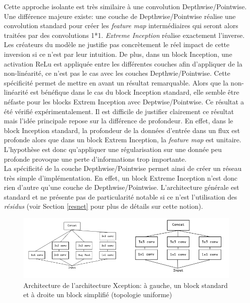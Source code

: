 \noindent Cette approche isolante est très similaire à une convolution Depthwise/Pointwise. Une différence majeure existe: une couche de Depthwise/Pointwise réalise une convolution standard pour créer les \textit{feature map} intermédiaires qui seront alors traitées par des convolutions 1*1. \textit{Extreme Inception} réalise exactement l'inverse. Les créateurs du modèle ne justifie pas concrètement le réel impact de cette inversion si ce n'est par leur intuition. De plus, dans un block Inception, une activation ReLu est appliquée entre les différentes couches afin d'appliquer de la non-linéarité, ce n'est pas le cas avec les couches Depthwie/Pointwise. Cette spécificité permet de mettre en avant un résultat remarquable. Alors que la non-linéarité est bénéfique dans le cas du block Inception standard\cite{inceptrelu}, elle semble être néfaste pour les blocks Extrem Inception avec Deptwise/Pointwise\cite{xception}. Ce résultat a été vérifié expérimentalement. Il est difficile de justifier clairement ce résultat mais l'idée principale repose sur la différence de profondeur. En effet, dans le block Inception standard, la profondeur de la données d'entrée dans un flux est profonde alors que dans un block Extrem Inception, la \textit{feature map} est unitaire. L'hypothèse est donc qu'appliquer une régularisation sur une donnée peu profonde provoque une perte d'informations trop importante.\\

\noindent La spécificité de la couche Depthwise/Pointwise permet ainsi de créer un réseau très simple d'implémentation. En effet, un block Extreme Inception n'est donc rien d'autre qu'une couche de Depthwise/Pointwise. L'architecture générale est standard et ne présente pas de particularité notable si ce n'est l'utilisation des \textit{résidus} (voir Section \ref{resnet} pour plus de détails sur cette notion).

\begin{figure}
    \centering
    \includegraphics[scale=0.4]{./tex/convolution-network/classifier/xception.png}
    \caption{Architecture de l'architecture Xception: à gauche, un block standard et à droite un block simplifié (topologie uniforme)}
    \label{xception}
\end{figure}

